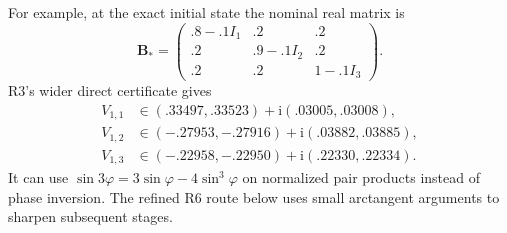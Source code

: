 \documentclass[11pt,a4paper]{article}
\numberwithin{equation}{section}
\newcommand{\ii}{\mathrm i}
\newcommand{\Bmat}{\mathbf B}
\begin{document}
For example, at the exact initial state the nominal real matrix is
\[
\Bmat_*=\begin{pmatrix}
.8-.1I_1&.2&.2\\ .2&.9-.1I_2&.2\\ .2&.2&1-.1I_3
\end{pmatrix}.
\]
R3's wider direct certificate gives
\[
\begin{aligned}
V_{1,1}&\in(.33497,.33523)+\ii(.03005,.03008),\\
V_{1,2}&\in(-.27953,-.27916)+\ii(.03882,.03885),\\
V_{1,3}&\in(-.22958,-.22950)+\ii(.22330,.22334).
\end{aligned}
\]
It can use $\sin3\varphi=3\sin\varphi-4\sin^3\varphi$ on normalized
pair products instead of phase inversion. The refined R6 route below
uses small arctangent arguments to sharpen subsequent stages.
\end{document}
